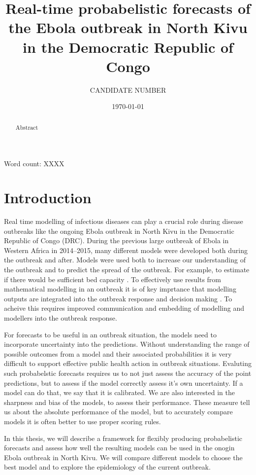 \documentclass[12pt]{article}
\title{Real-time probabelistic forecasts of the Ebola outbreak in North Kivu in the Democratic Republic of Congo}
\author{
  CANDIDATE NUMBER
}
\date{\today}
\begin{document}
\maketitle


Word count: XXXX

\begin{abstract}
  Abstract

\end{abstract}

\newpage

\tableofcontents

\section{Introduction}


Real time modelling of infectious diseases can play a crucial role during disease outbreaks like the ongoing Ebola outbreak in North Kivu in the Democratic Republic of Congo (DRC). During the previous large outbreak of Ebola in Western Africa in 2014--2015, many different models were developed both during the outbreak and after\cite{chretienMathematicalModelingWest}. Models were used both to increase our understanding of the outbreak and to predict the spread of the outbreak. For example, to estimate if there would be sufficient bed capacity \cite{camachoTemporalChangesEbola2015}. To effectively use results from mathematical modelling in an outbreak it is of key imprtance that modelling outputs are integrated into the outbreak response and decision making \cite{riversUsingOutbreakScience2019a}. To acheive this requires improved communication and embedding of modelling and modellers into the outbreak response. 


For forecasts to be useful in an outbreak situation, the models need to incorporate uncertainty into the predictions. Without understanding the range of possible outcomes from a model and their associated probabilities it is very difficult to support effective public health action in outbreak situations. Evaluting such probabelstic forecasts requires us to not just assess the accuracy of the point predictions, but to assess if the model correctly assess it's own uncertainty. If a model can do that, we say that it is calibrated. We are also interested in the sharpness and bias of the models, to assess their performance. These measure tell us about the absolute performance of the model, but to accurately compare models it is often better to use proper scoring rules.

In this thesis, we will describe a framework for flexibly producing probabelistic forecasts and assess how well the resulting models can be used in the onogin Ebola outbreak in North Kivu. We will compare different models to choose the best model and to explore the epidemiology of the current outbreak. 
\end{document}
